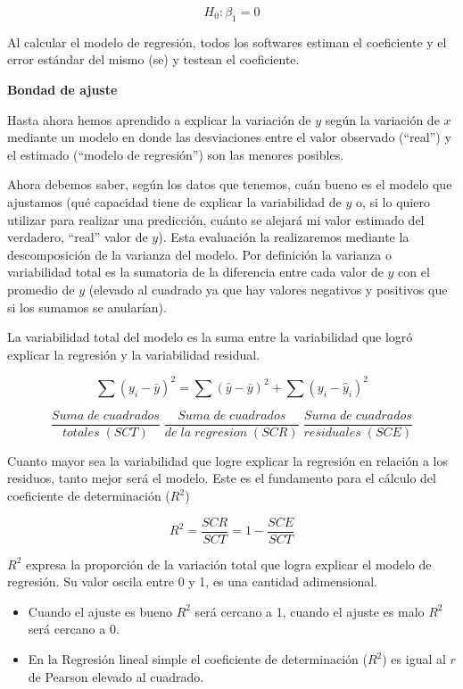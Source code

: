 \documentclass[
  letterpaper,
  DIV=11,
  numbers=noendperiod]{scrartcl}
\begin{document}
\[H_0: \beta_1 = 0 \]

Al calcular el modelo de regresión, todos los softwares estiman el
coeficiente y el error estándar del mismo (se) y testean el coeficiente.

\textbf{Bondad de ajuste}

Hasta ahora hemos aprendido a explicar la variación de \(y\) según la
variación de \(x\) mediante un modelo en donde las desviaciones entre el
valor observado (``real'') y el estimado (``modelo de regresión'') son
las menores posibles.

Ahora debemos saber, según los datos que tenemos, cuán bueno es el
modelo que ajustamos (qué capacidad tiene de explicar la variabilidad de
\(y\) o, si lo quiero utilizar para realizar una predicción, cuánto se
alejará mi valor estimado del verdadero, ``real'' valor de \(y\)). Esta
evaluación la realizaremos mediante la descomposición de la varianza del
modelo. Por definición la varianza o variabilidad total es la sumatoria
de la diferencia entre cada valor de \(y\) con el promedio de \(y\)
(elevado al cuadrado ya que hay valores negativos y positivos que si los
sumamos se anularían).

La variabilidad total del modelo es la suma entre la variabilidad que
logró explicar la regresión y la variabilidad residual.

\[\sum (y_i-\bar{y})^2 = \sum (\hat{y}-\bar{y})^2 + \sum (y_i -\hat{y}_i)^2 \]

\[\frac{Suma \; de \; cuadrados}{totales \; (SCT)} \; \frac{Suma \; de \; cuadrados}{de \; la \; regresion \; (SCR)} \; \frac{Suma \; de \; cuadrados}{residuales \; (SCE)}\]

Cuanto mayor sea la variabilidad que logre explicar la regresión en
relación a los residuos, tanto mejor será el modelo. Este es el
fundamento para el cálculo del coeficiente de determinación (\(R^2\))

\[R^2 = \frac{SCR}{SCT} = 1 - \frac{SCE}{SCT}\]

\(R^2\) expresa la proporción de la variación total que logra explicar
el modelo de regresión. Su valor oscila entre 0 y 1, es una cantidad
adimensional.

\begin{itemize}
\item
  Cuando el ajuste es bueno \(R^2\) será cercano a 1, cuando el ajuste
  es malo \(R^2\) será cercano a 0.
\item
  En la Regresión lineal simple el coeficiente de determinación
  (\(R^2\)) es igual al \(r\) de Pearson elevado al cuadrado.
\end{itemize}
\end{document}
